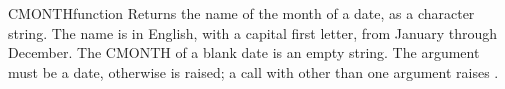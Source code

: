 \begin{XbaseEntry}{CMONTH}{function}
Returns the name of the month of a date, as a character string.
\Syntax
{}
\Usage
The name is in English, with a capital first letter, from January through December. The CMONTH of a blank date is an empty string. The argument must be a date, otherwise  is raised; a call with other than one argument raises .
\Examples
{}
\end{XbaseEntry}

